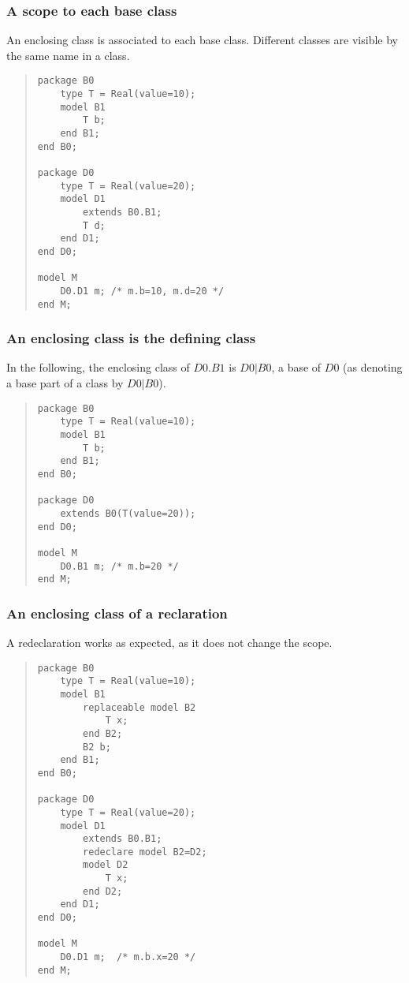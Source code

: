 \documentclass[10pt,b5paper]{article}
\begin{document}
\subsubsection*{A scope to each base class}

An enclosing class is associated to each base class.  Different
classes are visible by the same name in a class.

\begin{quote}
\begin{lstlisting}[aboveskip=-\baselineskip]
package B0
    type T = Real(value=10);
    model B1
        T b;
    end B1;
end B0;

package D0
    type T = Real(value=20);
    model D1
        extends B0.B1;
        T d;
    end D1;
end D0;

model M
    D0.D1 m; /* m.b=10, m.d=20 */
end M;
\end{lstlisting}
\end{quote}

\subsubsection*{An enclosing class is the defining class}

In the following, the enclosing class of $D0.B1$ is $D0|B0$, a base of
$D0$ (as denoting a base part of a class by $D0|B0$).

\begin{quote}
\begin{lstlisting}[aboveskip=-\baselineskip]
package B0
    type T = Real(value=10);
    model B1
        T b;
    end B1;
end B0;

package D0
    extends B0(T(value=20));
end D0;

model M
    D0.B1 m; /* m.b=20 */
end M;
\end{lstlisting}
\end{quote}

\subsubsection*{An enclosing class of a reclaration}

A redeclaration works as expected, as it does not change the scope.

\begin{quote}
\begin{lstlisting}[aboveskip=-\baselineskip]
package B0
    type T = Real(value=10);
    model B1
        replaceable model B2
            T x;
        end B2;
        B2 b;
    end B1;
end B0;

package D0
    type T = Real(value=20);
    model D1
        extends B0.B1;
        redeclare model B2=D2;
        model D2
            T x;
        end D2;
    end D1;
end D0;

model M
    D0.D1 m;  /* m.b.x=20 */
end M;
\end{lstlisting}
\end{quote}
\end{document}
